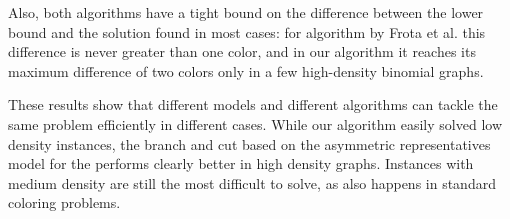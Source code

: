 Also, both algorithms have a tight bound on the difference between the lower bound and the solution found in most cases: for algorithm by Frota et al. this difference is never greater than one color, and in our algorithm it reaches its maximum difference of two colors only in a few high-density binomial graphs.

\vskip 25pt

These results show that different models and different algorithms can tackle the same problem efficiently in different cases. While our algorithm easily solved low density instances, the branch and cut based on the asymmetric representatives model for the \PCP{} performs clearly better in high density graphs. Instances with medium density are still the most difficult to solve, as also happens in standard coloring problems.
